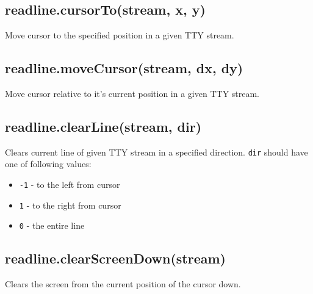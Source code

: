 \subsection{readline.cursorTo(stream, x,
y)}\label{readline.cursortostream-x-y}

Move cursor to the specified position in a given TTY stream.

\subsection{readline.moveCursor(stream, dx,
dy)}\label{readline.movecursorstream-dx-dy}

Move cursor relative to it's current position in a given TTY stream.

\subsection{readline.clearLine(stream,
dir)}\label{readline.clearlinestream-dir}

Clears current line of given TTY stream in a specified direction.
\texttt{dir} should have one of following values:

\begin{itemize}
\itemsep1pt\parskip0pt
\item
  \texttt{-1} - to the left from cursor
\item
  \texttt{1} - to the right from cursor
\item
  \texttt{0} - the entire line
\end{itemize}

\subsection{readline.clearScreenDown(stream)}\label{readline.clearscreendownstream}

Clears the screen from the current position of the cursor down.
